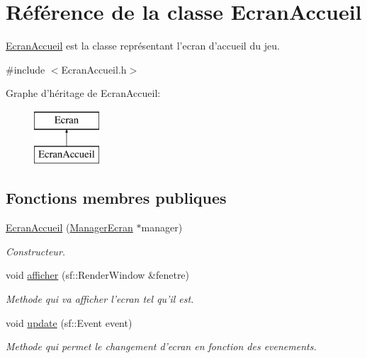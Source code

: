 \hypertarget{classEcranAccueil}{\section{\-Référence de la classe \-Ecran\-Accueil}
\label{classEcranAccueil}
}


\hyperlink{classEcranAccueil}{\-Ecran\-Accueil} est la classe représentant l'ecran d'accueil du jeu.  




{\ttfamily \#include $<$\-Ecran\-Accueil.\-h$>$}

\-Graphe d'héritage de \-Ecran\-Accueil\-:\begin{figure}[H]
\begin{center}
\leavevmode
\includegraphics[height=2.000000cm]{classEcranAccueil}
\end{center}
\end{figure}
\subsection*{\-Fonctions membres publiques}
\begin{DoxyCompactItemize}
\item 
\hypertarget{classEcranAccueil_a53449fe44e756cbfe0d19c372fab9783}{\hyperlink{classEcranAccueil_a53449fe44e756cbfe0d19c372fab9783}{\-Ecran\-Accueil} (\hyperlink{classManagerEcran}{\-Manager\-Ecran} $\ast$manager)}\label{classEcranAccueil_a53449fe44e756cbfe0d19c372fab9783}

\begin{DoxyCompactList}\small\item\em \-Constructeur. \end{DoxyCompactList}\item 
void \hyperlink{classEcranAccueil_acc1f211002209380daa8d13f5664c118}{afficher} (sf\-::\-Render\-Window \&fenetre)
\begin{DoxyCompactList}\small\item\em \-Methode qui va afficher l'ecran tel qu'il est. \end{DoxyCompactList}\item 
void \hyperlink{classEcranAccueil_ac03953623402740bab58ab7fbb54fc3a}{update} (sf\-::\-Event event)
\begin{DoxyCompactList}\small\item\em \-Methode qui permet le changement d'ecran en fonction des evenements. \end{DoxyCompactList}\end{DoxyCompactItemize}


